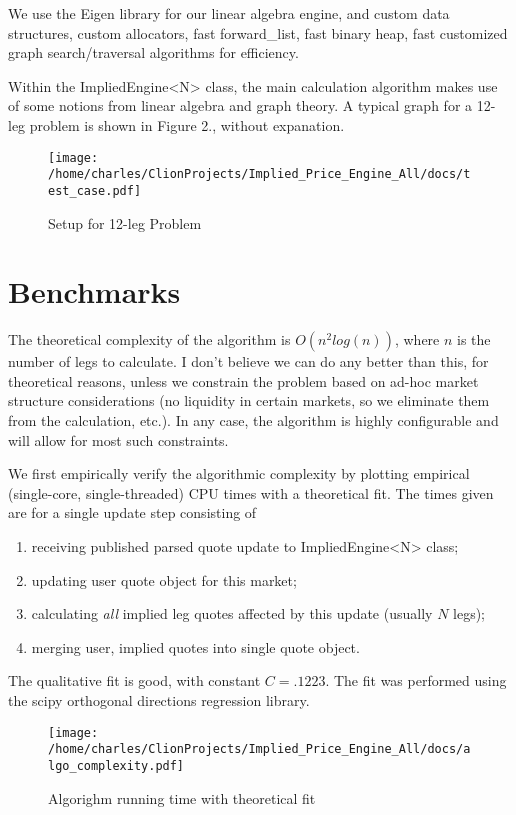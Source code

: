 \documentclass{article}
\begin{document}
We use the Eigen library for our linear algebra engine, and custom data structures, custom allocators, fast forward{\_}list, fast binary heap, fast customized  graph search/traversal algorithms for efficiency.

Within the ImpliedEngine<N> class, the main calculation algorithm makes use of some notions from linear algebra and graph theory. A typical graph for a 12-leg problem is shown in Figure 2., without expanation.

\begin{figure}
\texttt{[image: /home/charles/ClionProjects/Implied\_Price\_Engine\_All/docs/test\_case.pdf]}
\caption{Setup for 12-leg Problem}
\end{figure}
\section*{Benchmarks}

The theoretical complexity of the algorithm is $O(n^2 log(n))$, where $n$ is the number of legs to calculate. I don't believe we can do any better than this, for theoretical reasons, unless we constrain the problem based on ad-hoc market structure considerations (no liquidity in certain markets, so we eliminate them from the calculation, etc.). In any case, the algorithm is highly configurable and will allow for most such constraints.

We first empirically verify the algorithmic complexity by plotting empirical (single-core, single-threaded) CPU times with a theoretical fit. The times given are for a single update step consisting of 

\begin{enumerate}
\item receiving published parsed quote update to ImpliedEngine<N> class;
\item updating user quote object for this market;
\item calculating {\it all} implied leg quotes affected by this update (usually $N$ legs);
\item merging user, implied quotes into single quote object.
\end{enumerate}

The qualitative fit is good, with constant $C=.1223$. The fit was performed using the scipy orthogonal directions regression library.

\clearpage
\begin{figure}
\texttt{[image: /home/charles/ClionProjects/Implied\_Price\_Engine\_All/docs/algo\_complexity.pdf]}
\caption{Algorighm running time with theoretical fit}
\end{figure}
\end{document}
